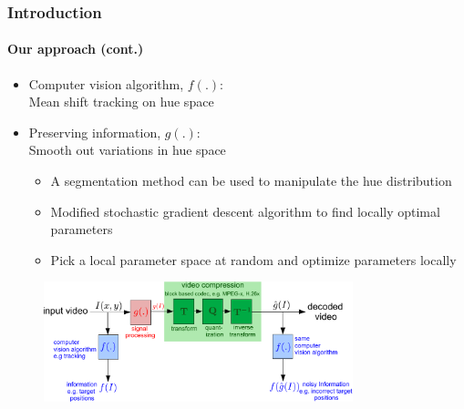 \begin{frame}
\frametitle{Introduction}
\framesubtitle{Our approach (cont.)}
\logoCSIPCPL\mypagenum
	\begin{itemize}
		\item {\color{red}Computer vision algorithm, $f(.)$:} \\ Mean shift tracking on hue space
		\item {\color{red}Preserving information,  $g(.)$:} \\ Smooth out variations in hue space
			\begin{itemize}
				\item A segmentation method can be used to manipulate the hue distribution
				\item Modified stochastic gradient descent algorithm to find locally optimal parameters
				\item Pick a local parameter space at random and optimize parameters locally
			\end{itemize}
	\end{itemize}
	\vspace{0.1in}
	\begin{figure}
		\includegraphics[width=0.8\textwidth]{figs/ICIP2009_SolutionThroughSigProc.pdf}
	\end{figure}
\end{frame}

